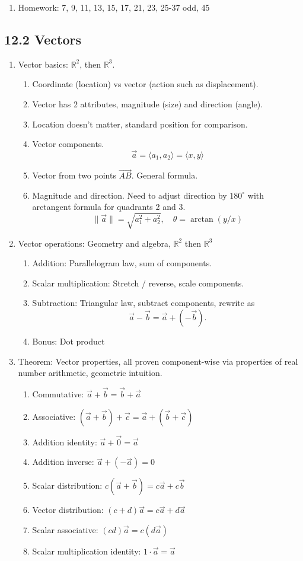 \documentclass{article}
\begin{document}
\begin{enumerate}
\item Homework: 7, 9, 11, 13, 15, 17, 21, 23, 25-37 odd, 45
\end{enumerate}

\subsection{12.2 Vectors}
\begin{enumerate}
\item Vector basics: $\mathbb{R}^2$, then $\mathbb{R}^3$. 
\begin{enumerate}
\item Coordinate (location) vs vector (action such as displacement).
\item Vector has 2 attributes, magnitude (size) and direction (angle).
\item Location doesn't matter, standard position for comparison.
\item Vector components.
\[
\vec{a} = \langle a_1, a_2 \rangle = \langle x, y \rangle
\]
\item Vector from two points $\vec{AB}$. General formula.
\item Magnitude and direction. Need to adjust direction by $180^{\circ}$ with arctangent formula for quadrants 2 and 3.
\[
\| \vec{a} \| = \sqrt{a_1^2+a_2^2}, \quad \theta = \arctan(y/x)
\]
\end{enumerate}

\item Vector operations: Geometry and algebra, $\mathbb{R}^2$ then $\mathbb{R}^3$
\begin{enumerate}
\item Addition: Parallelogram law, sum of components.
\item Scalar multiplication: Stretch / reverse, scale components.
\item Subtraction: Triangular law, subtract components, rewrite as
\[
\vec{a}-\vec{b} = \vec{a}+(-\vec{b}).
\]
\item Bonus: Dot product
\end{enumerate}

\item Theorem: Vector properties, all proven component-wise via properties of real number arithmetic, geometric intuition.
\begin{enumerate}
\item Commutative: $\vec{a} + \vec{b} = \vec{b}+\vec{a}$
\item Associative: $(\vec{a}+\vec{b})+\vec{c} = \vec{a} + (\vec{b}+\vec{c})$
\item Addition identity: $\vec{a}+\vec{0} = \vec{a}$
\item Addition inverse: $\vec{a}+(-\vec{a})=0$
\item Scalar distribution: $c(\vec{a}+\vec{b}) = c\vec{a}+c\vec{b}$
\item Vector distribution: $(c+d)\vec{a} = c\vec{a}+d\vec{a}$
\item Scalar associative: $(cd)\vec{a} = c(d\vec{a})$
\item Scalar multiplication identity: $1\cdot \vec{a} = \vec{a}$
\end{enumerate}


\end{enumerate}
\end{document}
